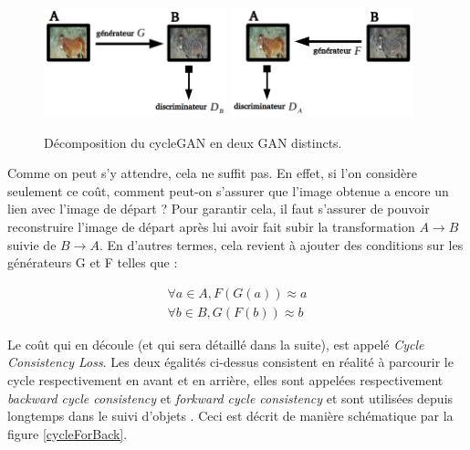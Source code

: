 \begin{figure}[!h]
\centering
\includegraphics[width=150pt]{"images/cycle_ganG"}
\hspace*{10mm}
\includegraphics[width=150pt]{"images/cycle_ganF"}
\caption{Décomposition du cycleGAN en deux GAN distincts.}
\label{cycle_ganGF}
\end{figure}

Comme on peut s'y attendre, cela ne suffit pas. En effet, si l'on considère seulement ce coût, comment peut-on s'assurer que l'image obtenue a encore un lien avec l'image de départ ? Pour garantir cela, il faut s'assurer de pouvoir reconstruire l'image de départ après lui avoir fait subir  la transformation $ A \rightarrow B $ suivie de $ B \rightarrow A $. En d'autres termes, cela revient à ajouter des conditions sur les générateurs G et F telles que :

\begin{equation}
\begin{split}
\forall a \in A, F(G(a)) \approx a \\
\forall b \in B, G(F(b)) \approx b
\end{split}
\end{equation}

Le coût qui en découle (et qui sera détaillé dans la suite), est appelé \textit{Cycle Consistency Loss}. Les deux égalités ci-dessus consistent en réalité à parcourir le cycle respectivement en avant et en arrière, elles sont appelées respectivement \textit{backward cycle consistency} et \textit{forkward cycle consistency} et sont utilisées depuis longtemps dans le suivi d'objets \cite{kalal_forward-backward_2010}. Ceci est décrit de manière schématique par la figure \ref{cycleForBack}.\\

